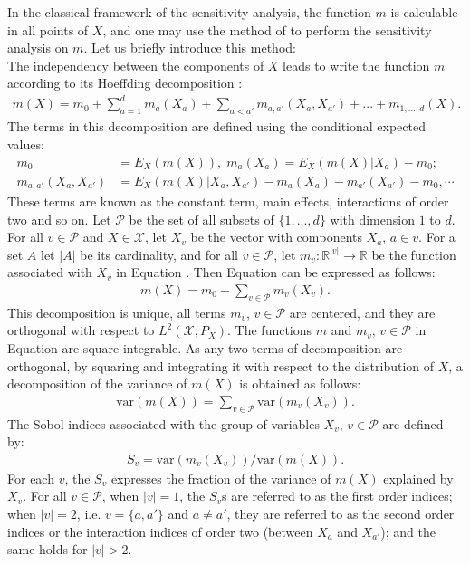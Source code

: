 In the classical framework of the sensitivity analysis, the function $m$ is calculable in all points of $X$, and one may use the method of \citet{Sobol1993SensitivityEF} to perform the sensitivity analysis on $m$. Let us briefly introduce this method:\\  
The independency between the components of $X$ leads to write the function $m$ according to its Hoeffding decomposition \citep{Sobol1993SensitivityEF,vaart_1998}:
\begin{align}
\label{sobol1}
m(X)=m_0+\sum_{a=1}^dm_a(X_a)+\sum_{a<a'}m_{a,a'}(X_a,X_{a'})+...+m_{1,...,d}(X).
\end{align}
The terms in this decomposition are defined using the conditional expected values:
\begin{align*}
m_0&=E_X(m(X)),\;
m_a(X_a)=E_X(m(X)|X_a)-m_0; \\
m_{a,a'}(X_a,X_{a'})&=E_X(m(X)|X_a,X_{a'})-m_a(X_a)-m_{a'}(X_{a'})-m_0, \cdots
\end{align*}
These terms are known as the constant term, main effects, interactions of order two and so on.
Let $\mathcal{P}$ be the set of all subsets of $\{1,...,d\}$ with dimension $1$ to $d$.  
For all $v\in\mathcal{P}$ and $X\in\mathcal{X}$, let $X_v$ be the vector with components $X_a$, $a\in v$. For a set $A$ let $\vert A\vert$ be its cardinality, and for all $v\in\mathcal{P}$, let $m_v:\mathbb{R}^{\vert v\vert}\rightarrow \mathbb{R}$ be the function associated with $X_v$ in Equation . Then Equation  can be expressed as follows:
\begin{align}
\label{ch3sobol}
m(X)=m_0+\sum_{v\in\mathcal{P}}m_v(X_v).
\end{align} 
This decomposition is unique, all terms $m_v$, $v\in\mathcal{P}$ are centered, and they are orthogonal with respect to $L^2(\mathcal{X},P_X)$.
The functions $m$ and $m_v$, $v\in\mathcal{P}$ in Equation  are square-integrable. As any two terms of decomposition  are orthogonal, by squaring  and integrating it with respect to the distribution of $X$, a decomposition of the variance of $m(X)$ is obtained as follows:
\begin{align}
\label{chpacvardecop}
\text{var}(m(X))=\sum_{v\in\mathcal{P}}\text{var}(m_v(X_v)).
\end{align}
The Sobol indices associated with the group of variables $X_v$, $v \in \mathcal{P}$ are defined by:
\begin{align}
\label{trusob}
S_v=\text{var}(m_v(X_v))/\text{var}(m(X)).
\end{align}
For each $v$, the $S_v$ expresses the fraction of the variance of $m(X)$ explained by $X_v$. For all $v\in\mathcal{P}$, when $\vert v\vert=1$, the $S_v$s are referred to as the first order indices; when $\vert v\vert =2$, i.e. $v=\{a,a'\}$ and $a\neq a'$, they are referred to as the second order indices or the interaction indices of order two (between $X_a$ and $X_{a'}$); and the same holds for $\vert v\vert>2$.

